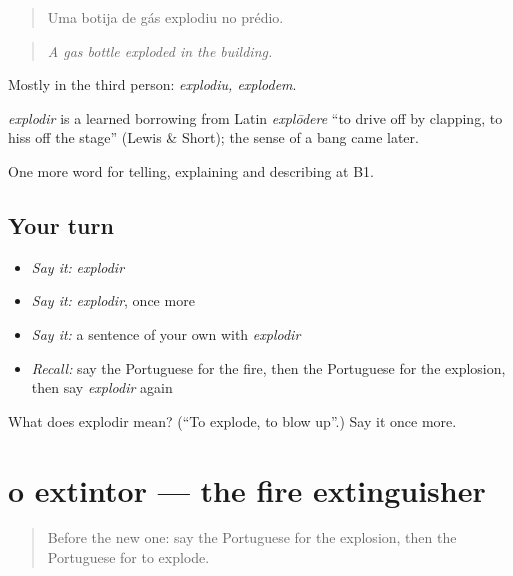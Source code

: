 \begin{quote}
Uma botija de gás explodiu no prédio.
\end{quote}

\begin{quote}
\emph{A gas bottle exploded in the building.}
\end{quote}

Mostly in the third person: \emph{explodiu, explodem}.

\begin{cousinweb}
\emph{explodir} is a learned borrowing from Latin \emph{explōdere} \textquotedblleft{}to drive off by clapping, to hiss off the stage\textquotedblright{} (Lewis \& Short); the sense of a bang came later.
\end{cousinweb}

\begin{grammarlens}[title={What you've built}]
One more word for telling, explaining and describing at B1.
\end{grammarlens}

\subsection*{Your turn}
\begin{itemize}
\raggedright
  \item \emph{Say it:} \emph{explodir}
  \item \emph{Say it:} \emph{explodir}, once more
  \item \emph{Say it:} a sentence of your own with \emph{explodir}
  \item \emph{Recall:} say the Portuguese for the fire, then the Portuguese for the explosion, then say \emph{explodir} again
\end{itemize}

\begin{tcolorbox}[breakable,colback=teal!4,colframe=teal!35!black,title={Before you move on}]
What does explodir mean? (\textquotedblleft{}To explode, to blow up\textquotedblright{}.) Say it once more.
\end{tcolorbox}
\section[o extintor]{o extintor — the fire extinguisher}

\label{lesson:PT-C301-extintor}



\begin{quote}
Before the new one: say the Portuguese for the explosion, then the Portuguese for to explode.
\end{quote}

